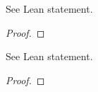 
\begin{lemma}\label{aux}
    \leanok
                See Lean statement.
    \end{lemma}

\begin{proof}
    \leanok
\end{proof}

\begin{theorem}\label{Ex}
    \leanok
                See Lean statement.
    \end{theorem}

\begin{proof}
    \leanok
\end{proof}

